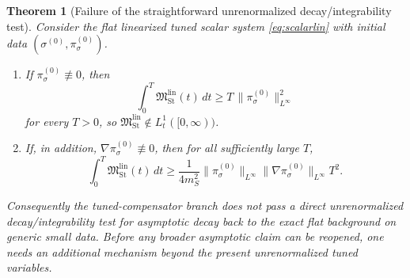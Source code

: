 \documentclass[11pt]{article}
\newtheorem{theorem}{Theorem}
\begin{document}
\begin{theorem}[Failure of the straightforward unrenormalized decay/integrability test]
\label{thm:failure}
Consider the flat linearized tuned scalar system \eqref{eq:scalarlin} with initial data \((\sigma^{(0)},\pi_\sigma^{(0)})\).
\begin{enumerate}
    \item If \(\pi_\sigma^{(0)}\not\equiv 0\), then
    \begin{equation}
    \int_0^T \mathfrak M_{\mathrm{St}}^{\mathrm{lin}}(t)\,dt
    \ge
    T\,\|\pi_\sigma^{(0)}\|_{L^\infty}^2
    \label{eq:constantlower}
    \end{equation}
    for every \(T>0\), so \(\mathfrak M_{\mathrm{St}}^{\mathrm{lin}}\notin L_t^1([0,\infty))\).
    \item If, in addition, \(\nabla\pi_\sigma^{(0)}\not\equiv 0\), then for all sufficiently large \(T\),
    \begin{equation}
    \int_0^T \mathfrak M_{\mathrm{St}}^{\mathrm{lin}}(t)\,dt
    \ge
    \frac{1}{4m_S^2}
    \|\pi_\sigma^{(0)}\|_{L^\infty}
    \|\nabla\pi_\sigma^{(0)}\|_{L^\infty}
    T^2.
    \label{eq:growthlower}
    \end{equation}
\end{enumerate}
Consequently the tuned-compensator branch does \emph{not} pass a direct unrenormalized decay/integrability test for asymptotic decay back to the exact flat background on generic small data. Before any broader asymptotic claim can be reopened, one needs an additional mechanism beyond the present unrenormalized tuned variables.
\end{theorem}
\end{document}
